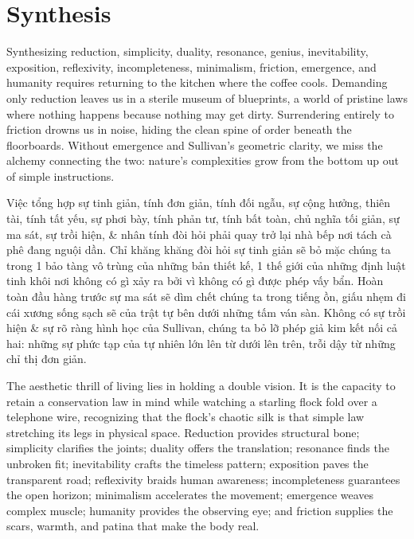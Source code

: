 \documentclass[11pt]{article}
\begin{document}
\section{Synthesis}
Synthesizing reduction, simplicity, duality, resonance, genius, inevitability, exposition, reflexivity, incompleteness, minimalism, friction, emergence, and humanity requires returning to the kitchen where the coffee cools. Demanding only reduction leaves us in a sterile museum of blueprints, a world of pristine laws where nothing happens because nothing may get dirty. Surrendering entirely to friction drowns us in noise, hiding the clean spine of order beneath the floorboards. Without emergence and Sullivan's geometric clarity, we miss the alchemy connecting the two: nature's complexities grow from the bottom up out of simple instructions.

Việc tổng hợp sự tinh giản, tính đơn giản, tính đối ngẫu, sự cộng hưởng, thiên tài, tính tất yếu, sự phơi bày, tính phản tư, tính bất toàn, chủ nghĩa tối giản, sự ma sát, sự trồi hiện, \& nhân tính đòi hỏi phải quay trở lại nhà bếp nơi tách cà phê đang nguội dần. Chỉ khăng khăng đòi hỏi sự tinh giản sẽ bỏ mặc chúng ta trong 1 bảo tàng vô trùng của những bản thiết kế, 1 thế giới của những định luật tinh khôi nơi không có gì xảy ra bởi vì không có gì được phép vấy bẩn. Hoàn toàn đầu hàng trước sự ma sát sẽ dìm chết chúng ta trong tiếng ồn, giấu nhẹm đi cái xương sống sạch sẽ của trật tự bên dưới những tấm ván sàn. Không có sự trồi hiện \& sự rõ ràng hình học của Sullivan, chúng ta bỏ lỡ phép giả kim kết nối cả hai: những sự phức tạp của tự nhiên lớn lên từ dưới lên trên, trỗi dậy từ những chỉ thị đơn giản.

The aesthetic thrill of living lies in holding a double vision. It is the capacity to retain a conservation law in mind while watching a starling flock fold over a telephone wire, recognizing that the flock's chaotic silk is that simple law stretching its legs in physical space. Reduction provides structural bone; simplicity clarifies the joints; duality offers the translation; resonance finds the unbroken fit; inevitability crafts the timeless pattern; exposition paves the transparent road; reflexivity braids human awareness; incompleteness guarantees the open horizon; minimalism accelerates the movement; emergence weaves complex muscle; humanity provides the observing eye; and friction supplies the scars, warmth, and patina that make the body real.
\end{document}
